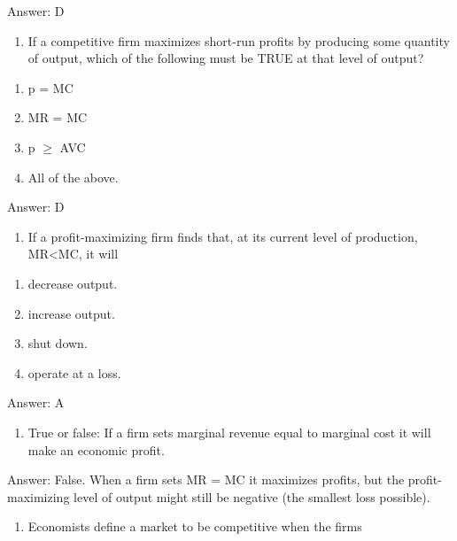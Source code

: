 \documentclass[11pt,]{article}
\providecommand{\tightlist}{%
  \setlength{\itemsep}{0pt}\setlength{\parskip}{0pt}}
\begin{document}
Answer: D

\begin{enumerate}
\def\labelenumi{\arabic{enumi})}
\setcounter{enumi}{7}
\tightlist
\item
  If a competitive firm maximizes short-run profits by producing some
  quantity of output, which of the following must be TRUE at that level
  of output?
\end{enumerate}

\begin{enumerate}
\def\labelenumi{\Alph{enumi})}
\tightlist
\item
  p = MC
\item
  MR = MC
\item
  p \(\geq\) AVC
\item
  All of the above.
\end{enumerate}

Answer: D

\begin{enumerate}
\def\labelenumi{\arabic{enumi})}
\setcounter{enumi}{8}
\tightlist
\item
  If a profit-maximizing firm finds that, at its current level of
  production, MR\textless MC, it will
\end{enumerate}

\begin{enumerate}
\def\labelenumi{\Alph{enumi})}
\tightlist
\item
  decrease output.
\item
  increase output.
\item
  shut down.
\item
  operate at a loss.
\end{enumerate}

Answer: A

\begin{enumerate}
\def\labelenumi{\arabic{enumi})}
\setcounter{enumi}{9}
\tightlist
\item
  True or false: If a firm sets marginal revenue equal to marginal cost
  it will make an economic profit.
\end{enumerate}

Answer: False. When a firm sets MR = MC it maximizes profits, but the
profit-maximizing level of output might still be negative (the smallest
loss possible).

\begin{enumerate}
\def\labelenumi{\arabic{enumi})}
\setcounter{enumi}{10}
\tightlist
\item
  Economists define a market to be competitive when the firms
\end{enumerate}
\end{document}
